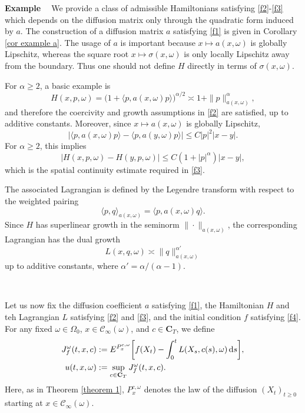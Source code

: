 \documentclass[11pt]{article}
\renewcommand{\d}{{\rm d}}
\newenvironment{example}
{
\refstepcounter{theorem}
{\bf Example \thetheorem\ }\nopagebreak
}
{
\nopagebreak {\hfill\rule{2mm}{2mm}}\\
}
\theoremstyle{rem}
\begin{document}
\noindent\begin{example}\label{exa HL} We provide a class of admissible Hamiltonians satisfying 
\ref{f2}-\ref{f3} which depends on the diffusion matrix only through the quadratic form induced 
by $a$. The construction of a diffusion matrix $a$ satisfying \ref{f1} is given in 
Corollary \ref{cor example a}. The usage of $a$  is important because $x\mapsto a(x,\omega)$ 
is globally Lipschitz, whereas the square root $x\mapsto \sigma(x,\omega)$ is only locally 
Lipschitz away from the boundary. Thus one should not define $H$ directly in terms of 
$\sigma(x,\omega)$.

For $\alpha\geq 2$, a basic example is
\[
H(x,p,\omega)
=
\bigl(1+\langle p,a(x,\omega)p\rangle\bigr)^{\alpha/2}
\asymp 1+\|p\|_{a(x,\omega)}^\alpha,
\]
and therefore the coercivity and growth assumptions in \ref{f2} are satisfied, up to additive constants.
Moreover, since $x\mapsto a(x,\omega)$ is globally Lipschitz,
\[
\big|
\langle p,a(x,\omega)p\rangle
-
\langle p,a(y,\omega)p\rangle
\big|
\leq C|p|^2|x-y|.
\]
For $\alpha\geq2$, this implies
\[
|H(x,p,\omega)-H(y,p,\omega)|
\leq
C(1+|p|^\alpha)|x-y|,
\]
which is the spatial continuity estimate required in \ref{f3}.

The associated Lagrangian is defined by the Legendre transform with respect to the weighted pairing
\[
\langle p,q\rangle_{a(x,\omega)}
=
\langle p,a(x,\omega)q\rangle.
\]
Since $H$ has superlinear growth in the seminorm $\|\cdot\|_{a(x,\omega)}$, the corresponding Lagrangian has the dual growth
\[
L(x,q,\omega)\asymp \|q\|_{a(x,\omega)}^{\alpha'}
\]
up to additive constants, where $\alpha'=\alpha/(\alpha-1)$.
\end{example}


 

Let us now fix the diffusion coefficient $a$ satisfying \ref{f1}, the Hamiltonian $H$ and teh Lagrangian $L$ satisfying \ref{f2} and \ref{f3}, and the initial condition $f$ satisfying \ref{f4}. For any fixed
$\omega\in\Omega_0$, $x\in\mathcal C_\infty(\omega)$, and
$c\in\mathbf C_T$, we define
\begin{align}
J_f^\omega(t,x,c)
&:=
E^{P_x^{c,\omega}}
\bigg[
f(X_t)
-
\int_0^t L(X_s,c(s),\omega)\,\d s
\bigg],
\label{eq:cost-fun-def}
\\
u(t,x,\omega)
&:=
\sup_{c\in\mathbf C_T}
J_f^\omega(t,x,c).
\label{eq:visc-sol-var-form}
\end{align}
Here, as in Theorem \ref{theorem 1}, $P_x^{c,\omega}$ denotes the law of the diffusion $(X_t)_{t\ge0}$ starting at $x\in\mathcal C_\infty(\omega)$.
\end{document}
